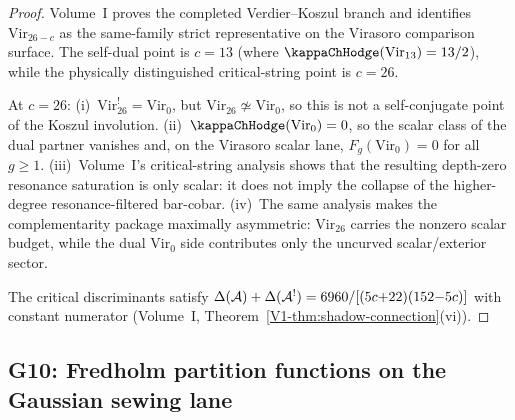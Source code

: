 \begin{proof}
Volume~I proves the completed Verdier--Koszul branch and identifies
$\mathrm{Vir}_{26-c}$ as the same-family strict representative on the
Virasoro comparison surface. The self-dual point is $c = 13$ (where
$\kappaChHodge(\mathrm{Vir}_{13}) = 13/2$), while the physically
distinguished critical-string point is $c = 26$.

At $c = 26$: (i)~$\mathrm{Vir}_{26}^! = \mathrm{Vir}_0$, but
$\mathrm{Vir}_{26} \not\simeq \mathrm{Vir}_0$, so this is not a
self-conjugate point of the Koszul involution.
(ii)~$\kappaChHodge(\mathrm{Vir}_0) = 0$, so the scalar class of the dual
partner vanishes and, on the Virasoro scalar lane,
$F_g(\mathrm{Vir}_0) = 0$ for all $g \ge 1$.
(iii)~Volume~I's critical-string analysis shows that the resulting
depth-zero resonance saturation is only scalar: it does not imply the
collapse of the higher-degree resonance-filtered bar-cobar.
(iv)~The same analysis makes the complementarity package maximally
asymmetric: $\mathrm{Vir}_{26}$ carries the nonzero scalar budget,
while the dual $\mathrm{Vir}_0$ side contributes only the uncurved
scalar/exterior sector.

The critical discriminants satisfy
$\Delta(\mathcal{A}) + \Delta(\mathcal{A}^!) = 6960/[(5c{+}22)(152{-}5c)]$
with constant numerator
(Volume~I, Theorem~\ref{V1-thm:shadow-connection}(vi)).
\end{proof}


\subsection{G10: Fredholm partition functions on the Gaussian sewing lane}

